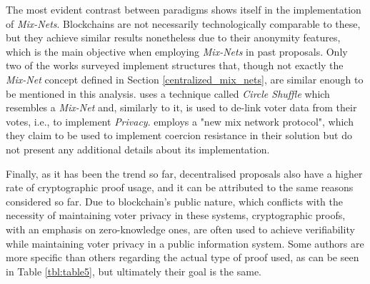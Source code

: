 \documentclass[../access.tex]{subfiles}
\begin{document}
\par
The most evident contrast between paradigms shows itself in the implementation of \textit{Mix-Nets}. Blockchains are not necessarily technologically comparable to these, but they achieve similar results nonetheless due to their anonymity features, which is the main objective when employing \textit{Mix-Nets} in past proposals. Only two of the works surveyed implement structures that, though not exactly the \textit{Mix-Net} concept defined in Section \ref{centralized_mix_nets}, are similar enough to be mentioned in this analysis. \cite{Bartolucci2018} uses a technique called \textit{Circle Shuffle} which resembles a \textit{Mix-Net} and, similarly to it, is used to de-link voter data from their votes, i.e., to implement \textit{Privacy}. \cite{Chaieb2020} employs a "new mix network protocol", which they claim to be used to implement coercion resistance in their solution but do not present any additional details about its implementation.
\par
Finally, as it has been the trend so far, decentralised proposals also have a higher rate of cryptographic proof usage, and it can be attributed to the same reasons considered so far. Due to blockchain's public nature, which conflicts with the necessity of maintaining voter privacy in these systems, cryptographic proofs, with an emphasis on zero-knowledge ones, are often used to achieve verifiability while maintaining voter privacy in a public information system. Some authors are more specific than others regarding the actual type of proof used, as can be seen in Table \ref{tbl:table5}, but ultimately their goal is the same.
\end{document}
